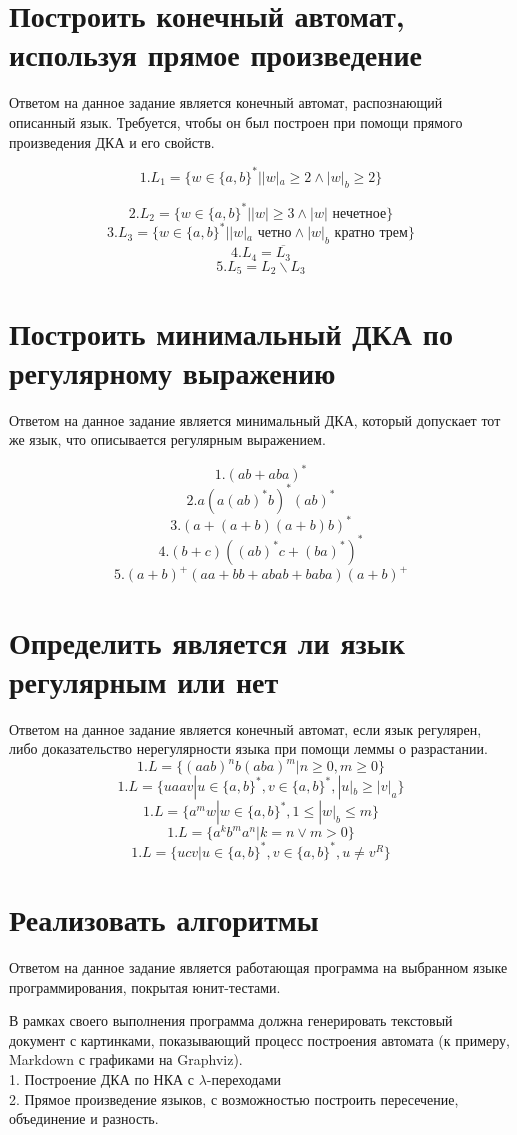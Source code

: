 \documentclass[a4paper, 12pt]{article}
\begin{document}
\section{Построить конечный автомат, используя прямое произведение}
Ответом на данное задание является конечный автомат, распознающий описанный язык. Требуется, чтобы он был построен при помощи прямого произведения ДКА и его свойств.

$$1. L_1 = \{ w \in \{a,b\}^* | |w|_a \geq 2 \land |w|_b \geq 2\}$$

$$2. L_2 = \{ w \in \{a,b\}^* | |w| \geq 3 \land |w| \text{ нечетное} \}$$
$$3. L_3 = \{ w \in \{a,b\}^* | |w|_a \text{ четно} \land |w|_b \text{ кратно трем} \}$$
$$4. L_4 = \overline{L_3}$$
$$5. L_5 = L_2 \backslash L_3$$

\section{Построить минимальный ДКА по регулярному выражению}
Ответом на данное задание является минимальный ДКА, который допускает тот же язык, что описывается регулярным выражением.

$$1. (ab + aba)^*$$
$$2. a(a(ab)^*b)^*(ab)^*$$
$$3. (a + (a + b)(a + b)b)^*$$
$$4. (b + c)((ab)^*c + (ba)^*)^*$$
$$5. (a + b)^+(aa + bb + abab + baba)(a + b)^+$$


\section{Определить является ли язык регулярным или нет}
Ответом на данное задание является конечный автомат, если язык регулярен, либо доказательство нерегулярности языка при помощи леммы о разрастании.
$$1. L = \{(aab)^nb(aba)^m | n \geq 0, m \geq 0\}$$
$$1. L = \{uaav | u \in \{a,b\}^*, v \in \{a,b\}^*, |u|_b \geq |v|_a\}$$
$$1. L = \{a^mw | w \in \{a, b\}^*, 1 \leq |w|_b \leq m  \}$$
$$1. L = \{ a^kb^ma^n | k = n \lor m > 0\}$$
$$1. L = \{ ucv | u \in \{a,b\}^*, v \in \{a,b\}^*, u \neq v^R \}$$

\section{Реализовать алгоритмы}
Ответом на данное задание является работающая программа на выбранном языке программирования, покрытая юнит-тестами.

В рамках своего выполнения программа должна генерировать текстовый документ с картинками, показывающий процесс построения автомата (к примеру, Markdown с графиками на Graphviz).\\
1. Построение ДКА по НКА с $\lambda$-переходами \\
2. Прямое произведение языков, с возможностью построить пересечение, объединение и разность.
\end{document}
